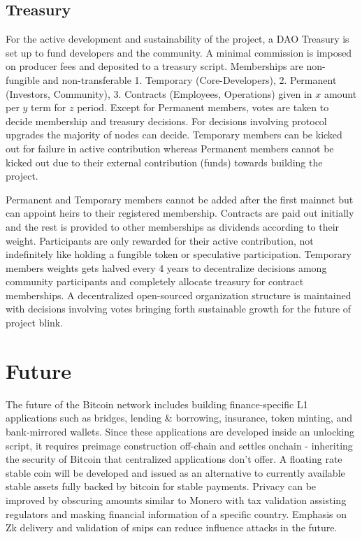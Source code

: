 \documentclass[a4paper,	10pt]{extarticle}
\begin{document}
\subsection{Treasury}
For the active development and sustainability of the project, a DAO Treasury is set up to fund developers and the community. A minimal commission is imposed on producer fees and deposited to a treasury script. Memberships are non-fungible and non-transferable 1. Temporary (Core-Developers), 2. Permanent (Investors, Community), 3. Contracts (Employees, Operations) given in $x$ amount per $y$ term for $z$ period. Except for Permanent members, votes are taken to decide membership and treasury decisions. For decisions involving protocol upgrades the majority of nodes can decide. Temporary members can be kicked out for failure in active contribution whereas Permanent members cannot be kicked out due to their external contribution (funds) towards building the project.

 Permanent and Temporary members cannot be added after the first mainnet but can appoint heirs to their registered membership. Contracts are paid out initially and the rest is provided to other memberships as dividends according to their weight. Participants are only rewarded for their active contribution, not indefinitely like holding a fungible token or speculative participation. Temporary members weights gets halved every 4 years to decentralize decisions among community participants and completely allocate treasury for contract memberships. A decentralized open-sourced organization structure is maintained with decisions involving votes bringing forth sustainable growth for the future of project blink.

\section{Future}
The future of the Bitcoin network includes building finance-specific L1 applications such as bridges, lending \& borrowing, insurance, token minting, and bank-mirrored wallets. Since these applications are developed inside an unlocking script, it requires preimage construction off-chain and settles onchain - inheriting the security of Bitcoin that centralized applications don't offer. A floating rate stable coin \cite{stablecoin} will be developed and issued as an alternative to currently available stable assets fully backed by bitcoin for stable payments. Privacy can be improved by obscuring amounts similar to Monero \cite{moneroct} with tax validation assisting regulators and masking financial information of a specific country. Emphasis on Zk delivery and validation of snips can reduce influence attacks in the future.
\end{document}
